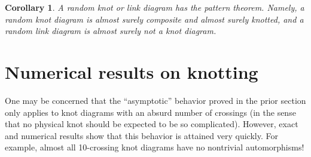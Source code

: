 \documentclass[amsmath,longbibliography,secnumarabic,floatfix,amssymb,nofootinbib,nobibnotes,letterpaper,11pt,notitlepage,tightenlines]{revtex4-1}
\newtheorem{corollary}[theorem]{Corollary}
\begin{document}
\begin{corollary}
  A random knot or link diagram has the pattern theorem. Namely, a random knot diagram is almost
  surely composite and almost surely knotted, and a random link diagram is almost surely not a knot
  diagram.
\end{corollary}

\section{Numerical results on knotting}
\label{sec:randres}

One may be concerned that the ``asymptotic'' behavior proved in the prior section only applies to
knot diagrams with an absurd number of crossings (in the sense that no physical knot should be
expected to be so complicated). However, exact and numerical results show that this behavior is
attained very quickly. For example, almost all 10-crossing knot diagrams have no nontrivial
automorphisms!


\end{document}
